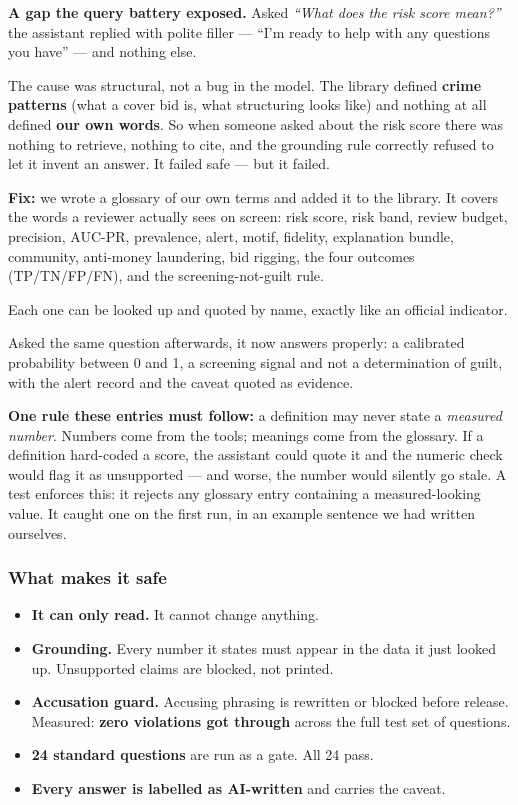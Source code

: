 \documentclass[11pt,a4paper]{article}
\begin{document}
\begin{warnbox}
\textbf{A gap the query battery exposed.} Asked \emph{``What does the risk score
mean?''} the assistant replied with polite filler --- ``I'm ready to help with any
questions you have'' --- and nothing else.

The cause was structural, not a bug in the model. The library defined
\textbf{crime patterns} (what a cover bid is, what structuring looks like) and
nothing at all defined \textbf{our own words}. So when someone asked about the
risk score there was nothing to retrieve, nothing to cite, and the grounding
rule correctly refused to let it invent an answer. It failed safe --- but it
failed.

\textbf{Fix:} we wrote a glossary of our own terms and added it to the library.
It covers the words a reviewer actually sees on screen: risk score, risk band,
review budget, precision, AUC-PR, prevalence, alert, motif, fidelity,
explanation bundle, community, anti-money laundering, bid rigging, the four
outcomes (TP/TN/FP/FN), and the screening-not-guilt rule.

Each one can be looked up and quoted by name, exactly like an official
indicator.

Asked the same question afterwards, it now answers properly: a calibrated
probability between 0 and 1, a screening signal and not a determination of
guilt, with the alert record and the caveat quoted as evidence.
\end{warnbox}

\textbf{One rule these entries must follow:} a definition may never state a
\emph{measured number}. Numbers come from the tools; meanings come from the
glossary. If a definition hard-coded a score, the assistant could quote it and
the numeric check would flag it as unsupported --- and worse, the number would
silently go stale. A test enforces this: it rejects any glossary entry
containing a measured-looking value. It caught one on the first run, in an
example sentence we had written ourselves.

\subsubsection*{What makes it safe}

\begin{itemize}
  \item \textbf{It can only read.} It cannot change anything.
  \item \textbf{Grounding.} Every number it states must appear in the data it just
        looked up. Unsupported claims are blocked, not printed.
  \item \textbf{Accusation guard.} Accusing phrasing is rewritten or blocked before
        release. Measured: \textbf{zero violations got through} across the full
        test set of questions.
  \item \textbf{24 standard questions} are run as a gate. All 24 pass.
  \item \textbf{Every answer is labelled as AI-written} and carries the caveat.
\end{itemize}
\end{document}
